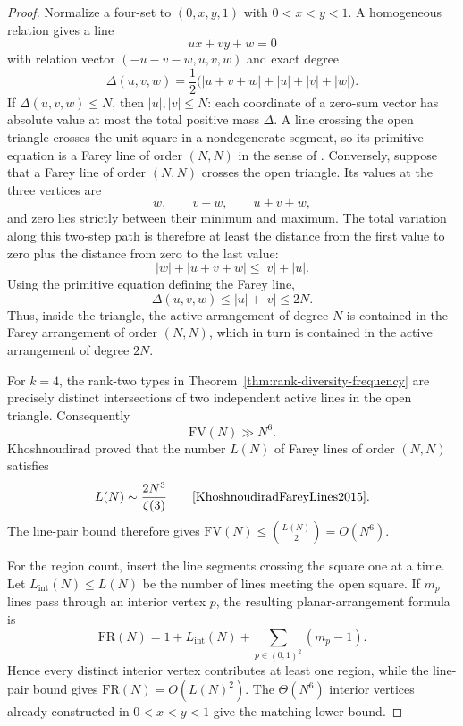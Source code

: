 \documentclass[11pt,reqno]{amsart}
\theoremstyle{definition}
\theoremstyle{remark}
\begin{document}
\begin{proof}
Normalize a four-set to $(0,x,y,1)$ with $0<x<y<1$. A homogeneous
relation gives a line
\[
 ux+vy+w=0
\]
with relation vector $(-u-v-w,u,v,w)$ and exact degree
\begin{equation}\label{eq:farey-relation-degree}
 \Delta(u,v,w)
 =\frac12\bigl(
 |u+v+w|+|u|+|v|+|w|\bigr).
\end{equation}
If $\Delta(u,v,w)\leq N$, then $|u|,|v|\leq N$: each coordinate of a
zero-sum vector has absolute value at most the total positive mass
$\Delta$. A line crossing the open triangle crosses the unit square in a
nondegenerate segment, so its primitive equation is a Farey line of order
$(N,N)$ in the sense of
\cite[Definition~1]{KhoshnoudiradFareyLines2015}.
Conversely, suppose that a Farey line of order $(N,N)$ crosses the open
triangle. Its values at the three vertices are
\[
 w,\qquad v+w,\qquad u+v+w,
\]
and zero lies strictly between their minimum and maximum. The total
variation along this two-step path is therefore at least the distance from
the first value to zero plus the distance from zero to the last value:
\[
 |w|+|u+v+w|\leq |v|+|u|.
\]
Using the primitive equation defining the Farey line,
\[
 \Delta(u,v,w)\leq |u|+|v|\leq2N.
\]
Thus, inside the triangle, the active arrangement of degree $N$ is
contained in the Farey arrangement of order $(N,N)$, which in turn is
contained in the active arrangement of degree $2N$.

For $k=4$, the rank-two types in
Theorem~\ref{thm:rank-diversity-frequency} are precisely distinct
intersections of two independent active lines in the open triangle.
Consequently
\[
 \mathrm{FV}(N)\gg N^6.
\]
Khoshnoudirad proved that the number $L(N)$ of Farey lines of order
$(N,N)$ satisfies
\[
 L(N)\sim\frac{2N^3}{\zeta(3)}
 \qquad\text{\cite[Theorem~3]{KhoshnoudiradFareyLines2015}}.
\]
The line-pair bound therefore gives
$\mathrm{FV}(N)\leq\binom{L(N)}2=O(N^6)$.

For the region count, insert the line segments crossing the square one at
a time.  Let $L_{\mathrm{int}}(N)\leq L(N)$ be the number of lines meeting
the open square.  If $m_p$ lines pass through an interior vertex $p$, the
resulting planar-arrangement formula is
\[
 \mathrm{FR}(N)
 =1+L_{\mathrm{int}}(N)+
   \sum_{p\in(0,1)^2}(m_p-1).
\]
Hence every distinct interior vertex contributes at least
one region, while the line-pair bound gives
$\mathrm{FR}(N)=O(L(N)^2)$.  The $\Theta(N^6)$ interior vertices already
constructed in $0<x<y<1$ give the matching lower bound.
\end{proof}
\end{document}
